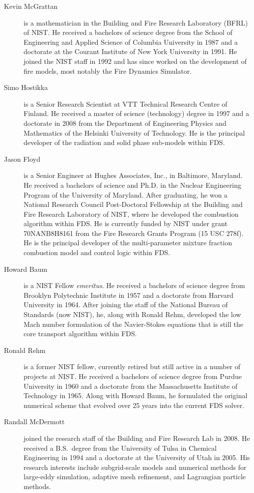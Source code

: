 \documentclass[11pt]{book}
\begin{document}
\begin{description}
\item[Kevin McGrattan] is a mathematician in the Building and Fire Research Laboratory (BFRL) of NIST. He received a bachelors of science degree from the School of Engineering and Applied Science of Columbia University in 1987 and a doctorate at the Courant Institute of New York University in 1991. He joined the NIST staff in 1992 and has since worked on the development of fire models, most notably the Fire Dynamics Simulator.
\item[Simo Hostikka] is a Senior Research Scientist at VTT Technical Research Centre of Finland. He received a master of science (technology) degree in 1997 and a doctorate in 2008 from the Department of Engineering Physics and Mathematics of the Helsinki University of Technology.  He is the principal developer of the radiation and solid phase sub-models within FDS.
\item[Jason Floyd] is a Senior Engineer at Hughes Associates, Inc., in Baltimore, Maryland. He received a bachelors of science and Ph.D. in the Nuclear Engineering Program of the University of Maryland. After graduating, he won a National Research Council Post-Doctoral Fellowship at the Building and Fire Research Laboratory of NIST, where he developed the combustion algorithm within FDS. He is currently funded by NIST under grant 70NANB8H8161 from the Fire Research Grants Program (15 USC 278f). He is the principal developer of the multi-parameter mixture fraction combustion model and control logic within FDS.
\item[Howard Baum] is a NIST Fellow {\em emeritus}. He received a bachelors of science degree from Brooklyn Polytechnic Institute in 1957 and a doctorate from Harvard University in 1964. After joining the staff of the National Bureau of Standards (now NIST), he, along with Ronald Rehm, developed the low Mach number formulation of the Navier-Stokes equations that is still the core transport algorithm within FDS.
\item[Ronald Rehm] is a former NIST fellow, currently retired but still active in a number of projects at NIST. He received a bachelors of science degree from Purdue University in 1960 and a doctorate from the Massachusetts Institute of Technology in 1965. Along with Howard Baum, he formulated the original numerical scheme that evolved over 25 years into the current FDS solver.
\item[Randall McDermott] joined the research staff of the Building and Fire Research Lab in 2008. He received a B.S.~degree from the University of Tulsa in Chemical Engineering in 1994 and a doctorate at the University of Utah in 2005. His research interests include subgrid-scale models and numerical methods for large-eddy simulation, adaptive mesh refinement, and Lagrangian particle methods.

\end{description}
\end{document}
